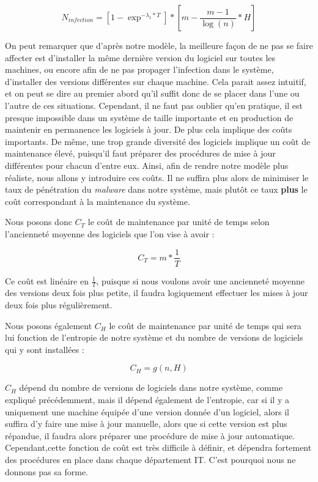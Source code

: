 \[
N_{infection}=[1-\exp^{-\lambda_1*T}] * [m-\frac{m-1}{\log(n)}*H]
\]

On peut remarquer que d'après notre modèle, la meilleure façon de ne pas se faire affecter est d'installer la même dernière version du logiciel sur toutes les machines, ou encore afin de ne pas propager l'infection dans le système, d'installer des versions différentes sur chaque machine. Cela parait assez intuitif, et on peut se dire au premier abord qu'il suffit donc de se placer dans l'une ou l'autre de ces situations. Cependant, il ne faut pas oublier qu'en pratique, il est presque impossible dans un système de taille importante et en production de maintenir en permanence les logiciels à jour. De plus cela implique des coûts importants. De même, une trop grande diversité des logiciels implique un coût de maintenance élevé, puisqu'il faut préparer des procédures de mise à jour différentes pour chacun d'entre eux.
Ainsi, afin de rendre notre modèle plus réaliste, nous allons y introduire ces coûts. Il ne suffira plus alors de minimiser le taux de pénétration du \textit{malware} dans notre système, mais plutôt ce taux \textbf{plus} le coût correspondant à la maintenance du système.

Nous posons donc $C_T$ le coût de maintenance par unité de temps selon l'ancienneté moyenne des logiciels que l'on vise à avoir :

\[
C_T=m*\frac{1}{T}
\]

Ce coût est linéaire en $\frac{1}{T}$, puisque si nous voulons avoir une ancienneté moyenne des versions deux fois plus petite, il faudra logiquement effectuer les mises à jour deux fois plus régulièrement.

Nous posons également $C_H$ le coût de maintenance par unité de temps qui sera lui fonction de l'entropie de notre système et du nombre de versions de logiciels qui y sont installées :

\[
C_H = g(n,H)
\]

$C_H$ dépend du nombre de versions de logiciels dans notre système, comme expliqué précédemment, mais il dépend également de l'entropie, car si il y a uniquement une machine équipée d'une version donnée d'un logiciel, alors il suffira d'y faire une mise à jour manuelle, alors que si cette version est plus répandue, il faudra alors préparer une procédure de mise à jour automatique. Cependant,cette fonction de coût est très difficile à définir, et dépendra fortement des procédures en place dans chaque département IT. C'est pourquoi nous ne donnons pas sa forme.

